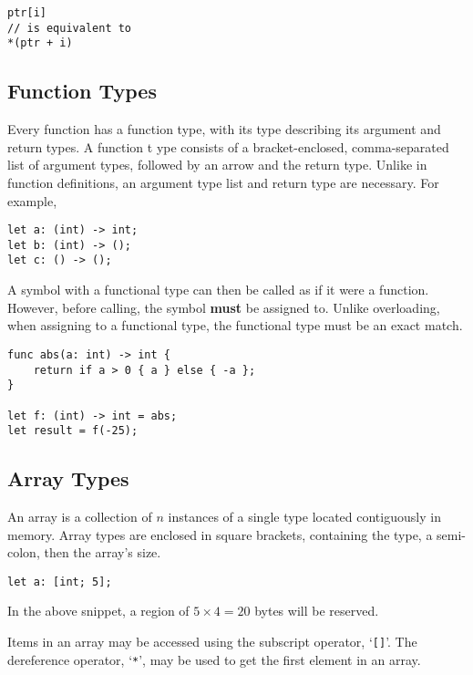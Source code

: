 \begin{lstlisting}[language=CustomLang]
ptr[i]
// is equivalent to
*(ptr + i)
\end{lstlisting}

\subsection{Function Types}\label{subsec:function-types}

Every function has a function type, with its type describing its argument and return types.
A function t ype consists of a bracket-enclosed, comma-separated list of argument types, followed by an arrow and the return type.
Unlike in function definitions, an argument type list and return type are necessary.
For example,

\begin{lstlisting}[language=CustomLang]
let a: (int) -> int;
let b: (int) -> ();
let c: () -> ();
\end{lstlisting}

A symbol with a functional type can then be called as if it were a function.
However, before calling, the symbol \textbf{must} be assigned to.
Unlike overloading, when assigning to a functional type, the functional type must be an exact match.

\begin{lstlisting}[language=CustomLang]
func abs(a: int) -> int {
    return if a > 0 { a } else { -a };
}

let f: (int) -> int = abs;
let result = f(-25);
\end{lstlisting}

\subsection{Array Types}\label{subsec:array-types}

An array is a collection of \(n\) instances of a single type located contiguously in memory.
Array types are enclosed in square brackets, containing the type, a semi-colon, then the array's size.

\begin{lstlisting}[language=CustomLang]
let a: [int; 5];
\end{lstlisting}

In the above snippet, a region of \(5 \times 4 = 20\) bytes will be reserved.

Items in an array may be accessed using the subscript operator, `\texttt{[]}'.
The dereference operator, `\texttt{*}', may be used to get the first element in an array.

